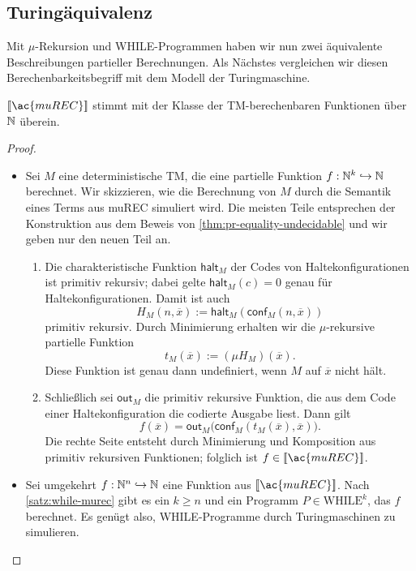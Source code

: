 \subsection{Turingäquivalenz}
\label{sec:turing-aquivalenz}


Mit $\mu$-Rekursion und WHILE-Programmen haben wir nun zwei äquivalente
Beschreibungen partieller Berechnungen. Als Nächstes vergleichen wir diesen
Berechenbarkeitsbegriff mit dem Modell der Turingmaschine.
\begin{Satz}[name={[\acs*{muREC} $\hat=$ Klasse der \acs*{TM}-berechenbaren Fkt.]}]
\label{satz:murec-tm}
	$\llbracket\ac{muREC}\rrbracket$ stimmt mit der Klasse der
	\ac{TM}-berechenbaren Funktionen über $\mathbb{N}$ überein.
\end{Satz}
\begin{proof}\
	\begin{itemize}
	\item[$\supseteq$] Sei $M$ eine deterministische \ac{TM}, die eine partielle
		Funktion $f:\mathbb{N}^k\hookrightarrow\mathbb{N}$ berechnet. Wir skizzieren, wie die
			Berechnung von $M$ durch die Semantik eines Terms aus \ac{muREC}
			simuliert wird. Die meisten Teile entsprechen der Konstruktion
                        aus dem Beweis von \autoref{thm:pr-equality-undecidable} und
                        wir geben nur den neuen Teil an.
		\begin{enumerate}
		\item Die charakteristische Funktion $\mathsf{halt}_{M}$ der Codes von
			Haltekonfigurationen ist primitiv rekursiv; dabei gelte
			$\mathsf{halt}_{M}(c)=0$ genau für Haltekonfigurationen. Damit ist auch
			\[
			H_{M}(n,\overline{x})
			:=\mathsf{halt}_{M}(\mathsf{conf}_{M}(n,\overline{x}))
			\]
			primitiv rekursiv. Durch Minimierung erhalten wir die $\mu$-rekursive
			partielle Funktion
			\[
			t_{M}(\overline{x})
			:=(\mu H_{M})(\overline{x}).
			\]
			Diese Funktion ist genau dann undefiniert, wenn $M$ auf
			$\overline{x}$ nicht hält.
		\item Schließlich sei $\mathsf{out}_{M}$ die primitiv rekursive Funktion,
			die aus dem Code einer Haltekonfiguration die codierte Ausgabe liest. Dann
			gilt
			\[
			f(\overline{x})=
			\mathsf{out}_{M}\bigl(
			\mathsf{conf}_{M}(t_{M}(\overline{x}),\overline{x})
			\bigr).
			\]
			Die rechte Seite entsteht durch Minimierung und Komposition aus primitiv
			rekursiven Funktionen; folglich ist
			$f\in\llbracket\ac{muREC}\rrbracket$.
		\end{enumerate}
	\item[$\subseteq$] Sei umgekehrt
		$f:\mathbb{N}^n\hookrightarrow\mathbb{N}$ eine Funktion aus
		$\llbracket\ac{muREC}\rrbracket$. Nach \autoref{satz:while-murec} gibt es
		ein $k\geq n$ und ein Programm $P\in\mathrm{WHILE}^k$, das $f$ berechnet.
		Es genügt also, WHILE-Programme durch Turingmaschinen zu simulieren.


\end{itemize}
\end{proof}
